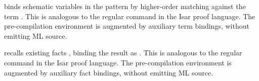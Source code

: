 \begin{isabellebody}
\begin{isamarkuptext}
\begin{description}
  \item {} binds schematic variables in the
  pattern  by higher-order matching against the term .  This is analogous to the regular \hyperlink{command.let}{\mbox{}} command
  in the Isar proof language.  The pre-compilation environment is
  augmented by auxiliary term bindings, without emitting ML source.

  \item {} recalls existing facts , binding the result as .  This is analogous to
  the regular \hyperlink{command.note}{\mbox{}} command in the Isar proof language.
  The pre-compilation environment is augmented by auxiliary fact
  bindings, without emitting ML source.


\end{description}
\end{isamarkuptext}
\end{isabellebody}
